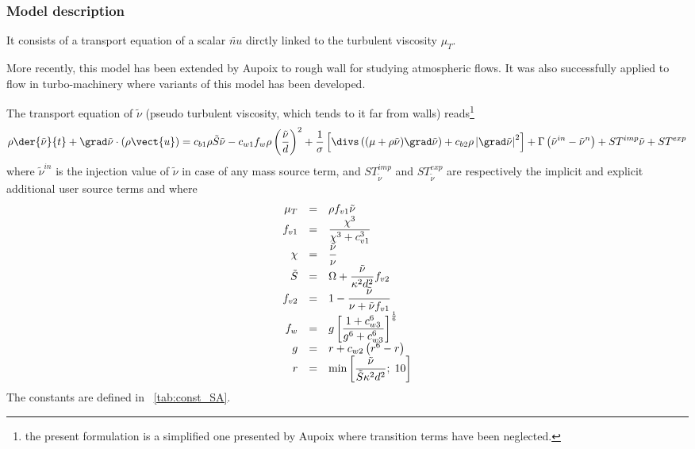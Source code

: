 \subsubsection{Model description}
It consists of a transport equation of a scalar $\tilde{nu}$ dirctly linked to the turbulent viscosity $\mu_T$. 

More recently, this model has been extended by Aupoix \cite{Aupoix:2003} to rough wall for studying atmospheric flows. It was also successfully applied to flow in turbo-machinery where variants of this model has been developed. 

The transport equation of $\tilde{\nu}$ (pseudo turbulent viscosity, which tends to it far from walls) reads\footnote{
the present formulation is a simplified one presented by Aupoix \cite{Aupoix:2003} where transition terms have been neglected.
}
\begin{equation}\label{eq:turbul:SA_used}
\rho \der{\tilde{\nu}}{ t} + \grad \tilde{\nu} \cdot\left( \rho \vect{u} \right)
= c_{b1} \rho  \tilde{S} \tilde{\nu}
- c_{w1}f_{w} \rho \left( \dfrac{\tilde{\nu}}{d} \right)^2
+ \dfrac{1}{ \sigma} \left[ \divs \left( (\mu + \rho \tilde{\nu}) \grad \tilde{\nu} \right)
+ c_{b2} \rho \left| \grad \tilde{\nu} \right| ^2 
  \right]
  + \Gamma \left( \tilde{\nu}^{in} - \tilde{\nu}^n \right) +ST^{imp} \tilde{\nu} +ST^{exp}
\end{equation}
%
where $\tilde{\nu}^{in}$ is the injection value of $\tilde{\nu}$ in case of any mass source term, and $ST^{imp}_{\tilde{\nu}}$ and $ST^{exp}_{\tilde{\nu}}$ 
are respectively the implicit and explicit additional user source terms and
where
%
\begin{equation}\label{eq:def_fun_SA}
\begin{array}{ r c l}
\mu_T & =& \rho f_{v1} \tilde{\nu} \\
f_{v1} &=& \dfrac{\chi^3 }{\chi^3+ c_{v1}^3} \\
\chi & = & \dfrac{\tilde{\nu}}{ \nu} \\
\tilde{S} &=& \Omega + \dfrac{\tilde{\nu}}{ \kappa ^2 d^2} f_{v2} \\
f_{v2} &=& 1 - \dfrac{ \tilde{\nu}}{\nu + \tilde{\nu} f_{v1}} \\
f_w &=& g \left[ \dfrac{1+ c_{w3}^6 }{g^6+ c_{w3}^6} \right]^\frac{1}{6} \\
g &=& r +c_{w2} \left( r^6 -r \right) \\
r &=& \min \left[ \dfrac{ \tilde{\nu} }{ \tilde{S} \kappa^ 2 d^2 } ; \; 10 \right]
\end{array}
\end{equation}
%
The constants are defined in \tablename~\ref{tab:const_SA}.

